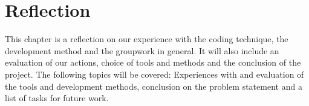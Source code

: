 \chapter{Reflection}
This chapter is a reflection on our experience with the coding technique, the development method and the groupwork in general. It will also include an evaluation of our actions, choice of tools and methods and the conclusion of the project. The following topics will be covered: Experiences with and evaluation of the tools and development methods, conclusion on the problem statement and a list of tasks for future work.



